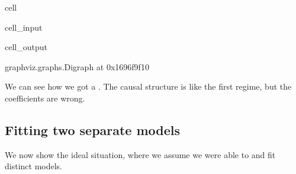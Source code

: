 \documentclass[letterpaper,10pt,english]{jupyterBook}
\begin{document}
\begin{sphinxuseclass}{cell}\begin{sphinxVerbatimInput}

\begin{sphinxuseclass}{cell_input}
\begin{sphinxVerbatim}[commandchars=\\\{\}]
   
 

  
  
  

  
  
\end{sphinxVerbatim}

\end{sphinxuseclass}\end{sphinxVerbatimInput}
\begin{sphinxVerbatimOutput}

\begin{sphinxuseclass}{cell_output}
\begin{sphinxVerbatim}[commandchars=\\\{\}]
\PYGZlt{}graphviz.graphs.Digraph at 0x1696f9f10\PYGZgt{}
\end{sphinxVerbatim}

\end{sphinxuseclass}\end{sphinxVerbatimOutput}

\end{sphinxuseclass}
\sphinxAtStartPar
We can see how we got a . The causal structure is like the first regime, but the coefficients are wrong.


\subsection{Fitting two separate models}
\label{\detokenize{notebooks/structural_breaks_example:fitting-two-separate-models}}
\sphinxAtStartPar
We now show the ideal situation, where we assume we were able to  and fit distinct models.
\end{document}
